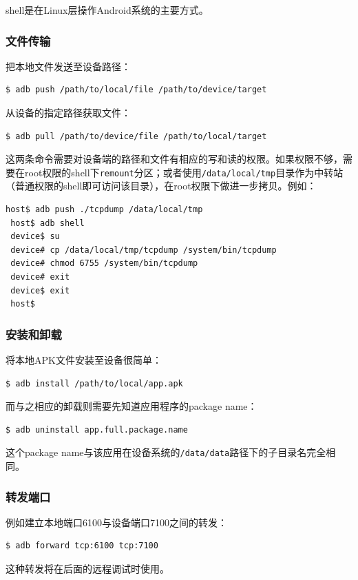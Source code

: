 shell是在Linux层操作Android系统的主要方式。

\subsubsection{文件传输}
把本地文件发送至设备路径：
\begin{lstlisting}[numbers=none]
 $ adb push /path/to/local/file /path/to/device/target
\end{lstlisting}

从设备的指定路径获取文件：
\begin{lstlisting}[numbers=none]
 $ adb pull /path/to/device/file /path/to/local/target
\end{lstlisting}
这两条命令需要对设备端的路径和文件有相应的写和读的权限。如果权限不够，需要在root权限的shell下\lstinline!remount!分区；或者使用\lstinline!/data/local/tmp!目录作为中转站（普通权限的shell即可访问该目录），在root权限下做进一步拷贝。例如：
\begin{lstlisting}[numbers=none]
 host$ adb push ./tcpdump /data/local/tmp
 host$ adb shell
 device$ su
 device# cp /data/local/tmp/tcpdump /system/bin/tcpdump
 device# chmod 6755 /system/bin/tcpdump
 device# exit
 device$ exit
 host$
\end{lstlisting}

\subsubsection{安装和卸载}
将本地APK文件安装至设备很简单：
\begin{lstlisting}[numbers=none]
 $ adb install /path/to/local/app.apk
\end{lstlisting}

而与之相应的卸载则需要先知道应用程序的package name：
\begin{lstlisting}[language=bash, numbers=none]
 $ adb uninstall app.full.package.name
\end{lstlisting}
这个package name与该应用在设备系统的\lstinline!/data/data!路径下的子目录名完全相同。

\subsubsection{转发端口}
例如建立本地端口6100与设备端口7100之间的转发：
\begin{lstlisting}[numbers=none]
 $ adb forward tcp:6100 tcp:7100
\end{lstlisting}
这种转发将在后面的远程调试时使用。

